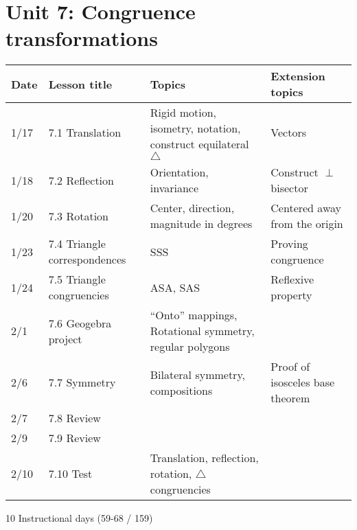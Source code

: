 \documentclass[12pt, twoside]{article}
\begin{document}
\section*{Unit 7: Congruence transformations}
\begin{tabular}{|p{0.9cm}|p{4cm}|p{7cm}|p{5cm}|}
  \hline
  Date & Lesson title & Topics  & Extension topics \\
  \hline
  1/17 & 7.1 Translation & Rigid motion, isometry, notation, construct equilateral $\triangle$ & Vectors \\
  \hline
  1/18 & 7.2 Reflection & Orientation, invariance & Construct $\perp$ bisector \\
  \hline
  1/20 & 7.3 Rotation & Center, direction, magnitude in degrees & Centered away from the origin \\
  \hline
  1/23 & 7.4 Triangle correspondences & SSS & Proving congruence \\
  \hline
  1/24 & 7.5 Triangle congruencies & ASA, SAS & Reflexive property \\
  \hline
  2/1 & 7.6 Geogebra project & ``Onto'' mappings, Rotational symmetry, regular polygons & \\
  \hline
  2/6 & 7.7 Symmetry & Bilateral symmetry, compositions & Proof of isosceles base theorem \\
  \hline
  2/7 & 7.8 Review &  &  \\
  \hline
  2/9 & 7.9 Review &  &  \\
  \hline
  2/10 & 7.10 Test & Translation, reflection, rotation, $\triangle$ congruencies &  \\
  \hline
\end{tabular} \par \vspace*{0.3cm}
10 Instructional days (59-68 / 159)
\end{document}
